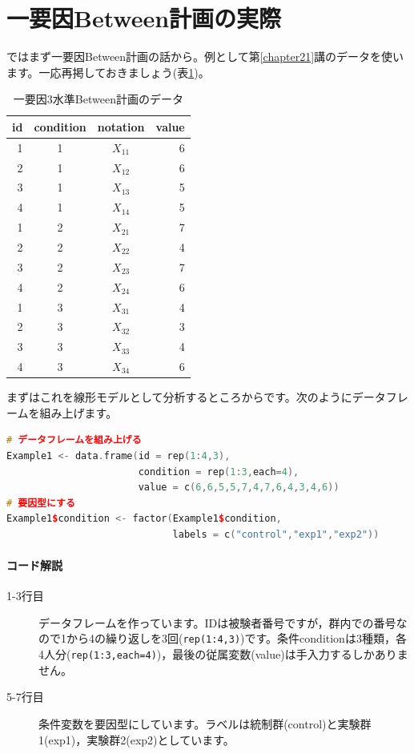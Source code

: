 \documentclass{ltjsarticle}
\begin{document}
\section{一要因Between計画の実際}
ではまず一要因Between計画の話から。例として第\ref{chapter21}講のデータを使います。一応再掲しておきましょう(表\ref{table::23_01})。
\begin{table}[ht]
    \centering
    \caption{一要因3水準Between計画のデータ}
    \begin{tabular}{rccr}
      \hline
    id & condition & notation & value \\ 
      \hline
      1 & 1 & $X_{11}$ & 6 \\ 
      2 & 1 & $X_{12}$ & 6 \\ 
      3 & 1 & $X_{13}$ & 5 \\ 
      4 & 1 & $X_{14}$ & 5 \\ 
      1 & 2 & $X_{21}$ & 7 \\ 
      2 & 2 & $X_{22}$ & 4 \\ 
      3 & 2 & $X_{23}$ & 7 \\ 
      4 & 2 & $X_{24}$ & 6 \\ 
      1 & 3 & $X_{31}$ & 4 \\ 
      2 & 3 & $X_{32}$ & 3 \\ 
      3 & 3 & $X_{33}$ & 4 \\ 
      4 & 3 & $X_{34}$ & 6 \\ 
       \hline
    \end{tabular}
    \label{table::23_01}
    \end{table}
まずはこれを線形モデルとして分析するところからです。次のようにデータフレームを組み上げます。

\begin{lstlisting}[language=c++]
# データフレームを組み上げる
Example1 <- data.frame(id = rep(1:4,3),
                       condition = rep(1:3,each=4),
                       value = c(6,6,5,5,7,4,7,6,4,3,4,6))
# 要因型にする
Example1$condition <- factor(Example1$condition,
                             labels = c("control","exp1","exp2"))\end{lstlisting}

\paragraph{コード解説}
\begin{description}
    \item[1-3行目] データフレームを作っています。IDは被験者番号ですが，群内での番号なので1から4の繰り返しを3回(\texttt{rep(1:4,3)})です。条件conditionは3種類，各4人分(\texttt{rep(1:3,each=4)})，最後の従属変数(value)は手入力するしかありません。
    \item[5-7行目] 条件変数を要因型にしています。ラベルは統制群(control)と実験群1(exp1)，実験群2(exp2)としています。
\end{description}
\end{document}
